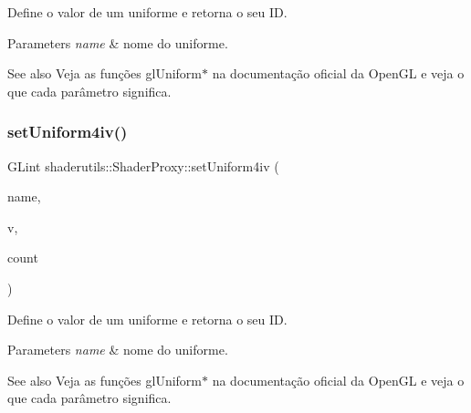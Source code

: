 Define o valor de um uniforme e retorna o seu ID. 
\begin{DoxyParams}{Parameters}
{\em name} & nome do uniforme. \\
\hline
\end{DoxyParams}
\begin{DoxySeeAlso}{See also}
Veja as funções gl\+Uniform$\ast$ na documentação oficial da Open\+GL e veja o que cada parâmetro significa. 
\end{DoxySeeAlso}
\mbox{\label{classshaderutils_1_1_shader_proxy_a920b2752650d3a211536576bb5a68698}} 
\subsubsection{\texorpdfstring{set\+Uniform4iv()}{setUniform4iv()}}
{\footnotesize\ttfamily G\+Lint shaderutils\+::\+Shader\+Proxy\+::set\+Uniform4iv (\begin{DoxyParamCaption}\item[{const char $\ast$}]{name,  }\item[{const G\+Lint $\ast$}]{v,  }\item[{G\+Luint}]{count }\end{DoxyParamCaption})\hspace{0.3cm}{\ttfamily [inline]}}

Define o valor de um uniforme e retorna o seu ID. 
\begin{DoxyParams}{Parameters}
{\em name} & nome do uniforme. \\
\hline
\end{DoxyParams}
\begin{DoxySeeAlso}{See also}
Veja as funções gl\+Uniform$\ast$ na documentação oficial da Open\+GL e veja o que cada parâmetro significa. 
\end{DoxySeeAlso}
\mbox{\label{classshaderutils_1_1_shader_proxy_a673855a58b328431d4346a353342c990}} 
